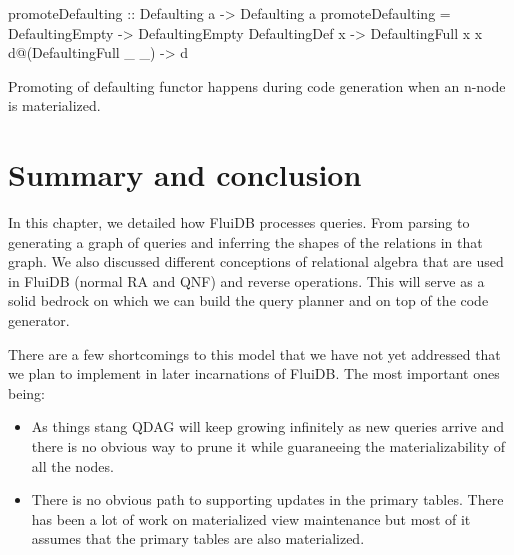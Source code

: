 \begin{code}
  \begin{haskellcode}
    promoteDefaulting :: Defaulting a -> Defaulting a
    promoteDefaulting = \case
      DefaultingEmpty        -> DefaultingEmpty
      DefaultingDef x        -> DefaultingFull x x
      d@(DefaultingFull _ _) -> d
  \end{haskellcode}
  \label{lst:promote_defaulting}
  \caption{Promoting of defaulting functor happens
    during code generation when an n-node is materialized.}
\end{code}

\section{Summary and conclusion}

In this chapter, we detailed how FluiDB processes queries. From
parsing to generating a graph of queries and inferring the shapes of
the relations in that graph. We also discussed different conceptions
of relational algebra that are used in FluiDB (normal RA and QNF) and
reverse operations. This will serve as a solid bedrock on which we can
build the query planner and on top of the code generator.

There are a few shortcomings to this model that we have not yet
addressed that we plan to implement in later incarnations of
FluiDB. The most important ones being:

\begin{itemize}
\item As things stang QDAG will keep growing infinitely as new queries
  arrive and there is no obvious way to prune it while guaraneeing the
  materializability of all the nodes.
\item There is no obvious path to supporting updates in the primary
  tables. There has been a lot of work on materialized view
  maintenance but most of it assumes that the primary tables
  are also materialized.
\end{itemize}
